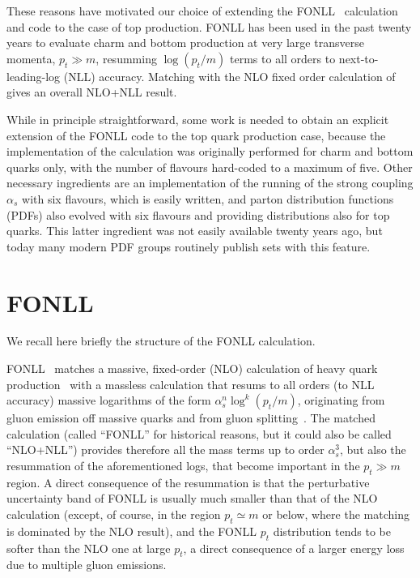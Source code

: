 \documentclass{PoS}
\begin{document}
These reasons have motivated our choice of extending the FONLL~\cite{Cacciari:1998it} calculation and
code to the case of top production. FONLL has been used in the past twenty
years to evaluate charm and bottom production at very large transverse momenta,
$p_t \gg m$, resumming  $\log(p_t/m)$ terms to all orders to
next-to-leading-log (NLL) accuracy. Matching with the NLO fixed order
calculation of~\cite{Nason:1989zy} gives an overall NLO+NLL result.

While in principle straightforward, some work is needed to obtain an explicit
extension of the FONLL code to the top quark production case, because the
implementation of the calculation was originally performed for charm and bottom
quarks only, with the number of flavours hard-coded to a maximum of five. Other
necessary ingredients are an implementation of the running of the strong
coupling $\alpha_s$ with six flavours, which is easily written, and parton
distribution functions (PDFs) also evolved with six flavours and providing
distributions also for top quarks. This latter ingredient was not easily
available twenty years ago, but today many modern PDF groups routinely publish
sets with this feature.

\section{FONLL}

We recall here briefly the structure of the FONLL calculation. 

FONLL~\cite{Cacciari:1998it} matches a massive, fixed-order (NLO) calculation of heavy quark 
production~\cite{Nason:1989zy} with a massless calculation that resums to all orders (to
NLL accuracy) massive logarithms of the form $\alpha_s^n \log^k(p_t/m)$, originating from
gluon emission off massive quarks and from gluon splitting~\cite{Cacciari:1993mq}. The
matched calculation (called ``FONLL'' for historical reasons, but it could also be called
``NLO+NLL'') provides therefore all the mass terms up to order $\alpha_s^3$, but also the
resummation of the aforementioned logs, that become important in the $p_t \gg m$ region.
A direct consequence of the resummation is that the perturbative uncertainty band of
FONLL is usually much smaller than that of the NLO calculation (except, of course, in the region
$p_t \simeq m$ or below, where the matching is dominated by the NLO result), and the
FONLL 
$p_t$ distribution tends to be softer than the NLO one at large $p_t$, a direct
consequence of a larger energy loss due to multiple gluon emissions.
\end{document}
